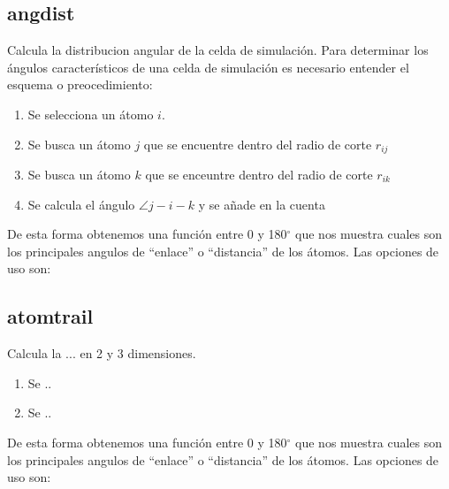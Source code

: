 \subsection{angdist}
Calcula la distribucion angular de la celda de simulaci\'on. Para determinar los
\'angulos caracter\'isticos de una celda de simulaci\'on es necesario entender
el esquema o preocedimiento:
\begin{enumerate}
 \item Se selecciona un \'atomo $i$.
 \item Se busca un \'atomo $j$ que se encuentre dentro del radio de corte $r_{ij}$
 \item Se busca un \'atomo $k$ que se enceuntre dentro del radio de corte $r_{ik}$
 \item Se calcula el \'angulo  $\angle j-i-k$ y se a\~nade en la cuenta
\end{enumerate}

De esta forma obtenemos una funci\'on entre 0 y 180$^\circ$ que nos muestra
cuales son los principales angulos de ``enlace'' o ``distancia'' de los
\'atomos. Las opciones de uso son:


\subsection{atomtrail}
Calcula la ... en 2 y 3 dimensiones.
\begin{enumerate}
 \item Se ..
 \item Se ..
\end{enumerate}

De esta forma obtenemos una funci\'on entre 0 y 180$^\circ$ que nos muestra
cuales son los principales angulos de ``enlace'' o ``distancia'' de los
\'atomos. Las opciones de uso son:

